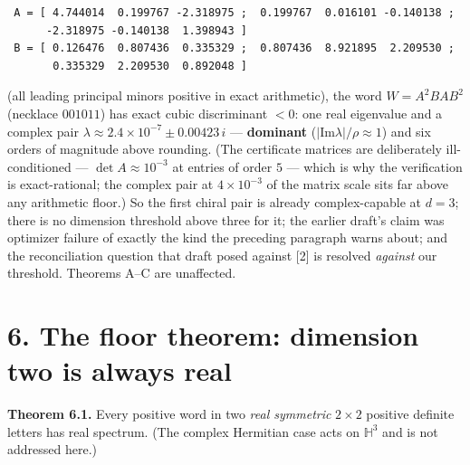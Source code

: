 \documentclass[11pt]{article}
\begin{document}
\begin{small}\begin{verbatim}
 A = [ 4.744014  0.199767 -2.318975 ;  0.199767  0.016101 -0.140138 ;
      -2.318975 -0.140138  1.398943 ]
 B = [ 0.126476  0.807436  0.335329 ;  0.807436  8.921895  2.209530 ;
       0.335329  2.209530  0.892048 ]
\end{verbatim}\end{small}
(all leading principal minors positive in exact arithmetic), the word $W = A^2BAB^2$ (necklace $001011$) has exact cubic discriminant $< 0$: one real eigenvalue and a complex pair $\lambda \approx 2.4\times 10^{-7} \pm 0.00423\,i$ — \textbf{dominant} ($|\mathrm{Im}\lambda|/\rho \approx 1$) and six orders of magnitude above rounding.  (The certificate matrices are deliberately ill-conditioned — $\det A \approx 10^{-3}$ at entries of order $5$ — which is why the verification is exact-rational; the complex pair at $4\times 10^{-3}$ of the matrix scale sits far above any arithmetic floor.)  So the first chiral pair is already complex-capable at $d = 3$; there is no dimension threshold above three for it; the earlier draft's claim was optimizer failure of exactly the kind the preceding paragraph warns about; and the reconciliation question that draft posed against [2] is resolved \emph{against} our threshold.  Theorems A–C are unaffected.

\section*{6. The floor theorem: dimension two is always real}
\textbf{Theorem 6.1.}  Every positive word in two \emph{real symmetric} $2\times 2$ positive definite letters has real spectrum.  (The complex Hermitian case acts on $\mathbb H^3$ and is not addressed here.)
\end{document}
